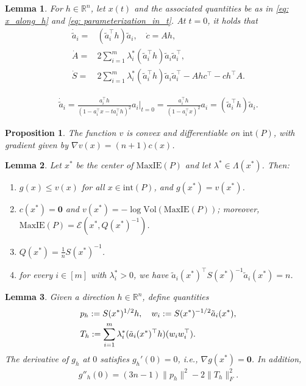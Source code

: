 \documentclass[10pt,a4paper]{amsart}
\newtheorem{lemma}{Lemma}
\newtheorem{proposition}{Proposition}
\newcommand{\E}{\mathcal{E}}
\newcommand{\MaxIE}{\mathrm{MaxIE}}
\newcommand{\R}{\mathbb{R}}
\newcommand{\V}{{\mathrm{Vol}}}
\begin{document}
\begin{lemma}\label{lemma: differentiation}
    For $h\in\R^n$, let $x(t)$ and the associated quantities be as in
    \eqref{eq: x_along_h} and \eqref{eq: parameterization_in_t}. At $t=0$, it holds that 
    \begin{align*}
        \dot{\tilde{a}}_i = & (\tilde{a}_i^\top h)\tilde{a}_i, \quad \dot{c} = Ah, \\
        \dot{A} = & 2 \sum_{i=1}^m \lambda_i^* (\tilde{a}_i^\top h) \tilde{a}_i \tilde{a}_i^\top, \\
        \dot{S} = & 2 \sum_{i=1}^m \lambda_i^* (\tilde{a}_i^\top h) \tilde{a}_i \tilde{a}_i^\top - Ahc^\top -c h^\top A.
    \end{align*}
\end{lemma}

    \begin{align}\label{eq: differentiating_tilde_a}
        \dot{\tilde{a}}_i =\frac{a_i^\top h}{(1-a_i^\top x - ta_i^\top h)^2} a_i\Bigg|_{t=0} = \frac{a_i^\top h}{(1-a_i^\top x)^2}a_i = (\tilde{a}_i^\top h)\tilde{a}_i.
    \end{align}

\begin{proposition}\label{proposition: v_gradient}
    The function $v$ is convex and differentiable on $\mathrm{int}(P)$, with gradient given by $\nabla v(x) = (n+1)c(x)$.
\end{proposition}

\begin{lemma}\label{lemma: facts_about_g}
Let $x^*$ be the center of $\MaxIE(P)$ and let
$\lambda^*\in\Lambda(x^*)$. Then:
\begin{enumerate}
    \item $g(x) \leq v(x)$ for all $x \in \mathrm{int}(P)$, and $g(x^*) = v(x^*)$.
    \item $c(x^*)=\mathbf0$ and
    $v(x^*)=-\log\V(\MaxIE(P))$; moreover,\\
    $\MaxIE(P)=\E(x^*,Q(x^*)^{-1})$.
    \item $Q(x^*) = \frac{1}{n}S(x^*)^{-1}$.
    \item for every $i\in [m]$ with $\lambda^*_i > 0$, we have $\tilde{a}_i(x^*)^\top S(x^*)^{-1}\tilde{a}_i(x^*) = n$.
\end{enumerate}
\end{lemma}

\begin{lemma}\label{lemma: derivative_of_g}
    Given a direction $h\in \R^n$, define quantities
    \begin{align}\label{eq: g_derivative_components}
        & p_h := S(x^*)^{1/2} h, \quad
        w_i := S(x^*)^{-1/2} \tilde{a}_i(x^*), \notag \\
        & T_h := \sum_{i=1}^m \lambda^*_i (\tilde{a}_i(x^*)^\top h)(w_iw_i^\top).
    \end{align}
    The derivative of $g_h$ at $0$ satisfies $g_h'(0) = 0$, i.e., $\nabla g(x^*) = \mathbf{0}$. In addition, 
    \begin{align*}
            g''_h(0) = (3n-1)\|p_h\|^2 - 2\|T_h\|_F^2.
    \end{align*}
\end{lemma}
\end{document}
